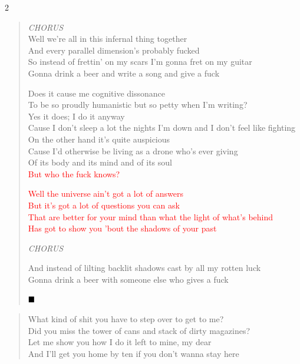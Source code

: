 \documentclass[11pt]{book}
\begin{document}
\begin{multicols}{2}
\begin{verse}
\hspace{2em} \emph{CHORUS}\\
\hspace{2em} Well we're all in this infernal thing together \\
\hspace{2em} And every parallel dimension's probably fucked \\
\hspace{2em} So instead of frettin' on my scars I'm gonna fret on my guitar \\
\hspace{2em} Gonna drink a beer and write a song and give a fuck

Does it cause me cognitive dissonance \\
To be so proudly humanistic but so petty when I'm writing? \\
Yes it does; I do it anyway \\
Cause I don't sleep a lot the nights I'm down and I don't feel like fighting \\
On the other hand it's quite auspicious \\
Cause I'd otherwise be living as a drone who's ever giving \\
Of its body and its mind and of its soul \\
\textcolor{Red}{But who the fuck knows?}

\textcolor{Red}{
\hspace{2em} Well the universe ain't got a lot of answers \\
\hspace{2em} But it's got a lot of questions you can ask \\
\hspace{2em} That are better for your mind than what the light of what's behind \\
\hspace{2em} Has got to show you 'bout the shadows of your past
}

\hspace{2em} \emph{CHORUS}

And instead of lilting backlit shadows cast by all my rotten luck \\
Gonna drink a beer with someone else who gives a fuck

$\hfill\blacksquare$
\end{verse}

\begin{verse}

\tiny
What kind of shit you have to step over to get to me? \\
Did you miss the tower of cans and stack of dirty magazines? \\
Let me show you how I do it left to mine, my dear \\
And I'll get you home by ten if you don't wanna stay here


\end{verse}
\end{multicols}
\end{document}
